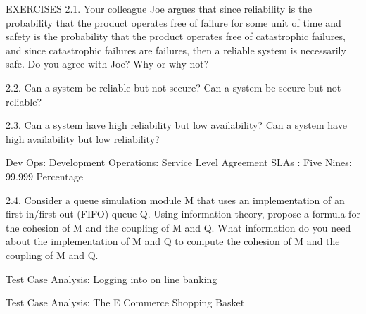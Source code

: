 EXERCISES
2.1. Your colleague Joe argues that since reliability is the probability that the product operates free of failure for some unit of time and safety is the probability that the product operates free of catastrophic failures, and since catastrophic failures are failures, then a reliable system is necessarily safe. Do you agree with Joe? Why or why not?

2.2. Can a system be reliable but not secure? Can a system be secure but not reliable?

2.3. Can a system have high reliability but low availability? Can a system have high availability but low reliability?

Dev Ops: Development Operations: Service Level Agreement SLAs : Five Nines: 99.999 Percentage

2.4. Consider a queue simulation module M that uses an implementation of an first in/first out (FIFO) queue Q. Using information theory, propose a formula for the cohesion of M and the coupling of M and Q. What information do you need about the implementation of M and Q to compute the cohesion of M and the coupling of M and Q.


Test Case Analysis: Logging into on line banking

Test Case Analysis: The E Commerce Shopping Basket